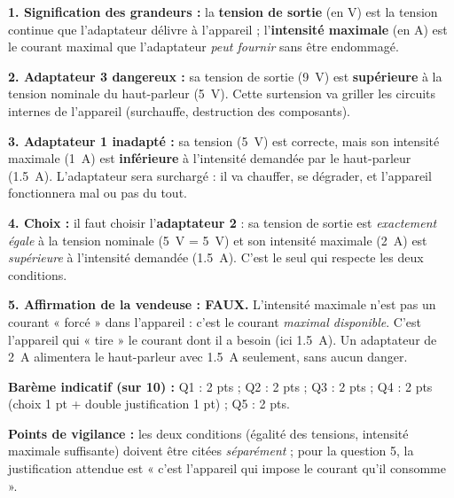 \documentclass[11pt]{article}
\begin{document}
\begin{corrige}
\textbf{1. Signification des grandeurs :} la \textbf{tension de sortie} (en V) est la tension continue que l'adaptateur délivre à l'appareil ; l'\textbf{intensité maximale} (en A) est le courant maximal que l'adaptateur \emph{peut fournir} sans être endommagé.

\textbf{2. Adaptateur 3 dangereux :} sa tension de sortie (\SI{9}{V}) est \textbf{supérieure} à la tension nominale du haut-parleur (\SI{5}{V}). Cette surtension va griller les circuits internes de l'appareil (surchauffe, destruction des composants).

\textbf{3. Adaptateur 1 inadapté :} sa tension (\SI{5}{V}) est correcte, mais son intensité maximale (\SI{1}{A}) est \textbf{inférieure} à l'intensité demandée par le haut-parleur (\SI{1,5}{A}). L'adaptateur sera surchargé : il va chauffer, se dégrader, et l'appareil fonctionnera mal ou pas du tout.

\textbf{4. Choix :} il faut choisir l'\textbf{adaptateur 2} : sa tension de sortie est \emph{exactement égale} à la tension nominale (\SI{5}{V} = \SI{5}{V}) et son intensité maximale (\SI{2}{A}) est \emph{supérieure} à l'intensité demandée (\SI{1,5}{A}). C'est le seul qui respecte les deux conditions.

\textbf{5. Affirmation de la vendeuse : FAUX.} L'intensité maximale n'est pas un courant « forcé » dans l'appareil : c'est le courant \emph{maximal disponible}. C'est l'appareil qui « tire » le courant dont il a besoin (ici \SI{1,5}{A}). Un adaptateur de \SI{2}{A} alimentera le haut-parleur avec \SI{1,5}{A} seulement, sans aucun danger.

\medskip
\textbf{Barème indicatif (sur 10) :} Q1 : 2 pts ; Q2 : 2 pts ; Q3 : 2 pts ; Q4 : 2 pts (choix 1 pt + double justification 1 pt) ; Q5 : 2 pts.

\textbf{Points de vigilance :} les deux conditions (égalité des tensions, intensité maximale suffisante) doivent être citées \emph{séparément} ; pour la question 5, la justification attendue est « c'est l'appareil qui impose le courant qu'il consomme ».
\end{corrige}
\end{document}
